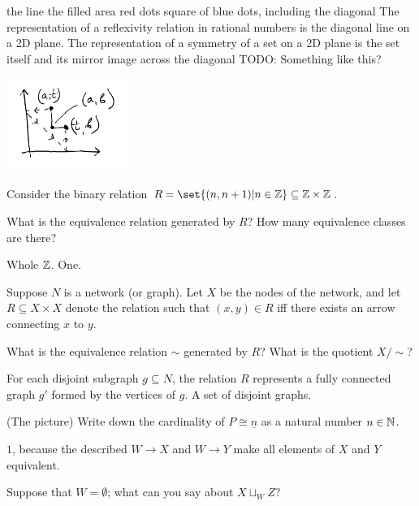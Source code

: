 \documentclass{article}
\begin{document}
\es the line
\ei the filled area
\ei red dots
\ei square of blue dots, including the diagonal
\ei The representation of a reflexivity relation in rational numbers is the diagonal line on a 2D
    plane. The representation of a symmetry of a set on a 2D plane is the set itself and its mirror
    image across the diagonal
\ei TODO: Something like this?
    \begin{center}
    \includegraphics[width=0.3\textwidth]{img/heuristic.png}
    \end{center}
\ee


Consider the binary relation $R = \set{(n,n+1)|n\in\Z}\subseteq\Z\times\Z$.

\es What is the equivalence relation generated by $R$?
\ei How many equivalence classes are there?
\ee

\ans

\es Whole $\mathbb{Z}$.
\ei One.
\ee


Suppose $N$ is a network (or graph). Let $X$ be the nodes of the network, and
let $R \subseteq X \times X$ denote the relation such that $(x, y) \in R$ iff
there exists an arrow connecting $x$ to $y$.

\es What is the equivalence relation $\sim$ generated by $R$?
\ei What is the quotient $X/\sim$?
\ee

\ans

\es For each disjoint subgraph $g \subseteq N$, the relation $R$ represents a
    fully connected graph $g'$ formed by the vertices of $g$.
\ei A set of disjoint graphs.
\ee


(The picture) Write down the cardinality of $P \cong \underline{n}$ as a natural
number $n \in \mathbb{N}$.

\ans

$1$, because the described $W \to X$ and $W \to Y$ make all elements of $X$ and
$Y$ equivalent.


Suppose that $W = \emptyset$; what can you say about $X \sqcup_W Z$?
\end{document}
